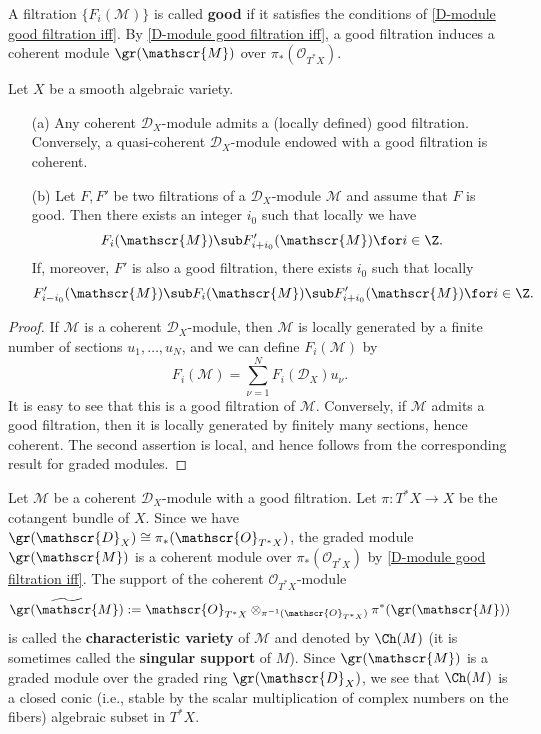 A filtration $\{F_i(\mathscr{M})\}$ is called \textbf{good} if it satisfies the conditions of \cref{D-module good filtration iff}. By \cref{D-module good filtration iff}, a good filtration induces a coherent module $\gr(\mathscr{M})$ over $\pi_*(\mathscr{O}_{T^*X})$.

\begin{theorem}\label{D-module good filtration iff coh}
Let $X$ be a smooth algebraic variety.
\begin{enumerate}
    \item[(a)] Any coherent $\mathscr{D}_X$-module admits a (locally defined) good filtration. Conversely, a quasi-coherent $\mathscr{D}_X$-module endowed with a good filtration is coherent.
    \item[(b)] Let $F,F'$ be two filtrations of a $\mathscr{D}_X$-module $\mathscr{M}$ and assume that $F$ is good. Then there exists an integer $i_0$ such that locally we have
    \[F_i(\mathscr{M})\sub F'_{i+i_0}(\mathscr{M})\for i\in\Z.\]
    If, moreover, $F'$ is also a good filtration, there exists $i_0$ such that locally
    \[F'_{i-i_0}(\mathscr{M})\sub F_i(\mathscr{M})\sub F'_{i+i_0}(\mathscr{M})\for i\in\Z.\] 
\end{enumerate}
\end{theorem}
\begin{proof}
If $\mathscr{M}$ is a coherent $\mathscr{D}_X$-module, then $\mathscr{M}$ is locally generated by a finite number of sections $u_1,\dots,u_N$, and we can define $F_i(\mathscr{M})$ by
\[F_i(\mathscr{M})=\sum_{\nu=1}^{N}F_i(\mathscr{D}_X)u_\nu.\]
It is easy to see that this is a good filtration of $\mathscr{M}$. Conversely, if $\mathscr{M}$ admits a good filtration, then it is locally generated by finitely many sections, hence coherent. The second assertion is local, and hence follows from the corresponding result for graded modules.
\end{proof}

Let $\mathscr{M}$ be a coherent $\mathscr{D}_X$-module with a good filtration. Let $\pi:T^*X\to X$ be the cotangent bundle of $X$. Since we have $\gr(\mathscr{D}_X)\cong\pi_*(\mathscr{O}_{T^*X})$, the graded module $\gr(\mathscr{M})$ is a coherent module over $\pi_*(\mathscr{O}_{T^*X})$ by \cref{D-module good filtration iff}. The support of the coherent $\mathscr{O}_{T^*X}$-module
\[\widetilde{\gr(\mathscr{M})}:=\mathscr{O}_{T^*X}\otimes_{\pi^{-1}(\mathscr{O}_{T^*X})}\pi^*(\gr(\mathscr{M}))\]
is called the \textbf{characteristic variety} of $\mathscr{M}$ and denoted by $\Ch(M)$ (it is sometimes called the \textbf{singular support} of $M$). Since $\gr(\mathscr{M})$ is a graded module over the graded ring $\gr(\mathscr{D}_X)$, we see that $\Ch(M)$ is a closed conic (i.e., stable by the scalar multiplication of complex numbers on the fibers) algebraic subset in $T^*X$.

